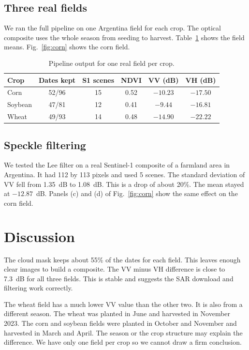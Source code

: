 \documentclass[conference]{IEEEtran}
\begin{document}
\subsection{Three real fields}
We ran the full pipeline on one Argentina field for each crop. The optical composite uses the whole season from seeding to harvest. Table~\ref{tab:fields} shows the field means. Fig.~\ref{fig:corn} shows the corn field.

\begin{table}[t]
\caption{Pipeline output for one real field per crop.}
\label{tab:fields}
\centering
\footnotesize
\setlength{\tabcolsep}{3pt}
\begin{tabular}{lccccc}
\toprule
Crop & Dates kept & S1 scenes & NDVI & VV (dB) & VH (dB)\\
\midrule
Corn    & 52/96 & 15 & 0.52 & $-10.23$ & $-17.50$\\
Soybean & 47/81 & 12 & 0.41 & $-9.44$  & $-16.81$\\
Wheat   & 49/93 & 14 & 0.48 & $-14.90$ & $-22.22$\\
\bottomrule
\end{tabular}
\end{table}

\subsection{Speckle filtering}
We tested the Lee filter on a real Sentinel-1 composite of a farmland area in Argentina. It had 112 by 113 pixels and used 5 scenes. The standard deviation of VV fell from 1.35~dB to 1.08~dB. This is a drop of about 20\%. The mean stayed at $-12.87$~dB. Panels (c) and (d) of Fig.~\ref{fig:corn} show the same effect on the corn field.

\section{Discussion}
The cloud mask keeps about 55\% of the dates for each field. This leaves enough clear images to build a composite. The VV minus VH difference is close to 7.3~dB for all three fields. This is stable and suggests the SAR download and filtering work correctly.

The wheat field has a much lower VV value than the other two. It is also from a different season. The wheat was planted in June and harvested in November 2023. The corn and soybean fields were planted in October and November and harvested in March and April. The season or the crop structure may explain the difference. We have only one field per crop so we cannot draw a firm conclusion.
\end{document}
